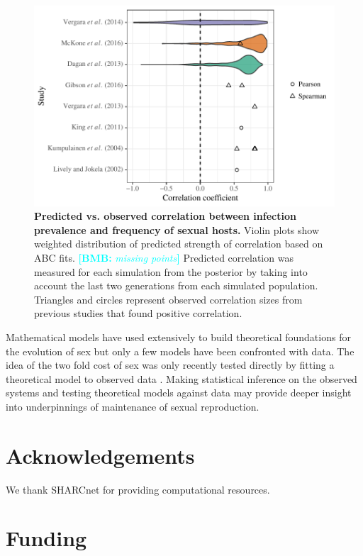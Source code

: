 \documentclass{article}\usepackage[]{graphicx}\usepackage[]{color}
\newcommand{\comment}[3]{\textcolor{#1}{\textbf{[#2: }\textit{#3}\textbf{]}}}
\newcommand{\bmb}[1]{\comment{cyan}{BMB}{#1}}
\begin{document}
\begin{figure}[!ht]
\includegraphics[width=\textwidth]{../fig/effect_size.pdf}
\caption{{\bf Predicted vs. observed correlation between infection prevalence and frequency of sexual hosts.}
Violin plots show weighted distribution of predicted strength of correlation based on ABC fits. \bmb{missing points}
Predicted correlation was measured for each simulation from the posterior by taking into account the last two generations from each simulated population.
Triangles and circles represent observed correlation sizes from previous studies that found positive correlation.
}
\label{fig:effect}
\end{figure}

Mathematical models have used extensively to build theoretical foundations for the evolution of sex but only a few models have been confronted with data.
The idea of the two fold cost of sex was only recently tested directly by fitting a theoretical model to observed data \citep{gibson2017two}.
Making statistical inference on the observed systems and testing theoretical models against data may provide deeper insight into underpinnings of maintenance of sexual reproduction.

\section{Acknowledgements}

We thank SHARCnet for providing computational resources. 

\section{Funding}
\end{document}
